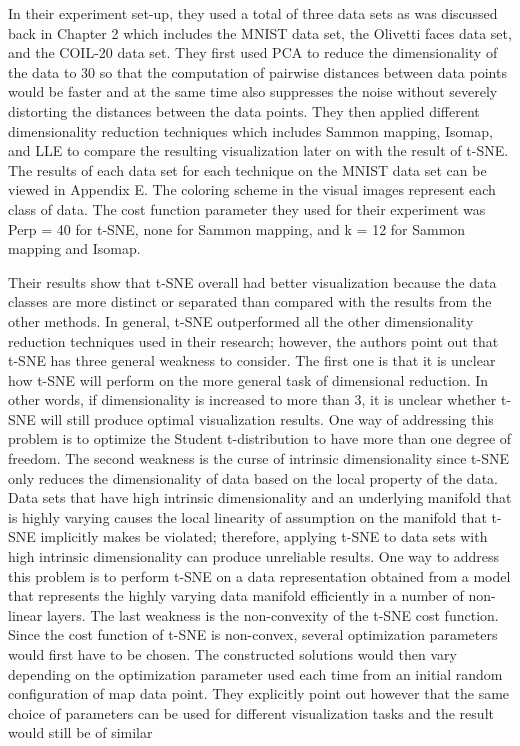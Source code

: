 In their experiment set-up, they used a total of three data sets as was discussed back in Chapter 2 which includes the MNIST data set, the Olivetti faces data set, and the COIL-20 data set. They first used PCA to reduce the dimensionality of the data to 30 so that the computation of pairwise distances between data points would be faster and at the same time also suppresses the noise without severely distorting the distances between the data points. They then applied different dimensionality reduction techniques which includes Sammon mapping, Isomap, and LLE to compare the resulting visualization later on with the result of t-SNE. The results of each data set for each technique on the MNIST data set can be viewed in Appendix E. The coloring scheme in the visual images represent each class of data. The cost function parameter they used for their experiment was Perp = 40 for t-SNE, none for Sammon mapping, and k = 12 for Sammon mapping and Isomap.

Their results show that t-SNE overall had better visualization because the data classes are more distinct or separated than compared with the results from the other methods.  In general, t-SNE outperformed all the other dimensionality reduction techniques used in their research; however, the authors point out that t-SNE has three general weakness to consider. The first one is that it is unclear how t-SNE will perform on the more general task of dimensional reduction. In other words, if dimensionality is increased to more than 3, it is unclear whether t-SNE will still produce optimal visualization results. One way of addressing this problem is to optimize the Student t-distribution to have more than one degree of freedom. The second weakness is the curse of intrinsic dimensionality since t-SNE only reduces the dimensionality of data based on the local property of the data. Data sets that have high intrinsic dimensionality and an underlying manifold that is highly varying causes the local linearity of assumption on the manifold that t-SNE implicitly makes be violated; therefore, applying t-SNE to data sets with high intrinsic dimensionality can produce unreliable results. One way to address this problem is to perform t-SNE on a data representation obtained from a model that represents the highly varying data manifold efficiently in a number of non-linear layers. The last weakness is the non-convexity of the t-SNE cost function. Since the cost function of t-SNE is non-convex, several optimization parameters would first have to be chosen. The constructed solutions would then vary depending on the optimization parameter used each time from an initial random configuration of map data point. They explicitly point out however that the same choice of parameters can be used for different visualization tasks and the result would still be of similar

